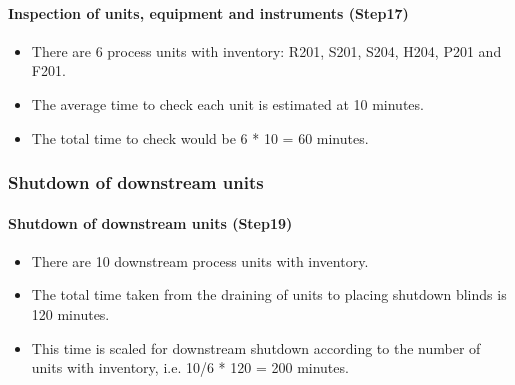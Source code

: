 \paragraph{Inspection of units, equipment and instruments (Step17)}
    \begin{itemize}
        \item There are 6 process units with inventory: R201, S201, S204, H204, P201 and F201.
        \item The average time to check each unit is estimated at 10 minutes.
        \item The total time to check would be 6 * 10 = 60 minutes.
    \end{itemize}

\subsubsection{Shutdown of downstream units}
\paragraph{Shutdown of downstream units (Step19)}
    \begin{itemize}
        \item There are 10 downstream process units with inventory.
        \item The total time taken from the draining of units to placing shutdown blinds is 120 minutes.
        \item This time is scaled for downstream shutdown according to the number of units with inventory, i.e. 10/6 * 120 = 200 minutes.
    \end{itemize}